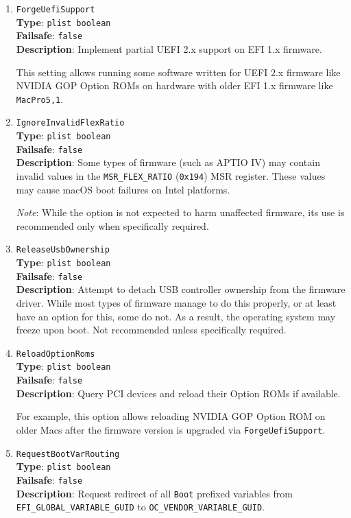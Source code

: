 \documentclass[]{article}
\begin{document}
\begin{enumerate}
\item
  \texttt{ForgeUefiSupport}\\
  \textbf{Type}: \texttt{plist\ boolean}\\
  \textbf{Failsafe}: \texttt{false}\\
  \textbf{Description}: Implement partial UEFI 2.x support on EFI 1.x firmware.

  This setting allows running some software written for UEFI 2.x firmware like NVIDIA GOP
  Option ROMs on hardware with older EFI 1.x firmware like \texttt{MacPro5,1}.

\item
  \texttt{IgnoreInvalidFlexRatio}\\
  \textbf{Type}: \texttt{plist\ boolean}\\
  \textbf{Failsafe}: \texttt{false}\\
  \textbf{Description}: Some types of firmware (such as APTIO IV) may contain invalid values in the
  \texttt{MSR\_FLEX\_RATIO} (\texttt{0x194}) MSR register. These values may cause
  macOS boot failures on Intel platforms.

  \emph{Note}: While the option is not expected to harm unaffected firmware,
  its use is recommended only when specifically required.

\item
  \texttt{ReleaseUsbOwnership}\\
  \textbf{Type}: \texttt{plist\ boolean}\\
  \textbf{Failsafe}: \texttt{false}\\
  \textbf{Description}: Attempt to detach USB controller ownership from
  the firmware driver. While most types of firmware manage to do this properly,
  or at least have an option for this, some do not. As a result, the operating
  system may freeze upon boot. Not recommended unless specifically required.

\item
  \texttt{ReloadOptionRoms}\\
  \textbf{Type}: \texttt{plist\ boolean}\\
  \textbf{Failsafe}: \texttt{false}\\
  \textbf{Description}: Query PCI devices and reload their Option ROMs if available.

  For example, this option allows reloading NVIDIA GOP Option ROM on older Macs
  after the firmware version is upgraded via \texttt{ForgeUefiSupport}.

\item
  \texttt{RequestBootVarRouting}\\
  \textbf{Type}: \texttt{plist\ boolean}\\
  \textbf{Failsafe}: \texttt{false}\\
  \textbf{Description}: Request redirect of all \texttt{Boot} prefixed variables from
  \texttt{EFI\_GLOBAL\_VARIABLE\_GUID} to \newline \texttt{OC\_VENDOR\_VARIABLE\_GUID}.


\end{enumerate}
\end{document}
